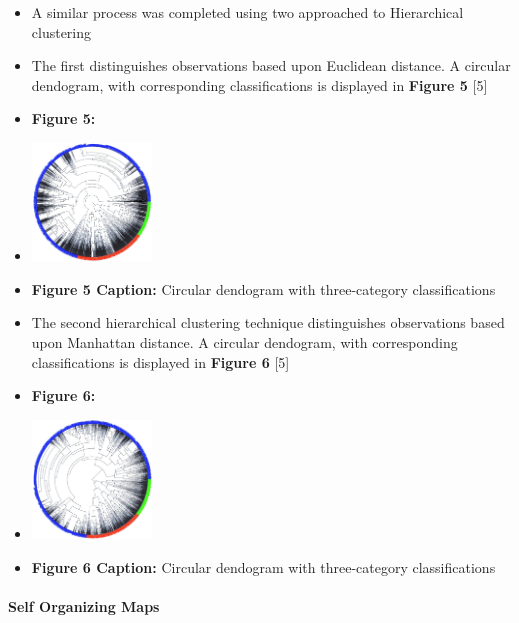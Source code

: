 \documentclass[12pt,]{article}
\providecommand{\tightlist}{%
  \setlength{\itemsep}{0pt}\setlength{\parskip}{0pt}}
\let\oldparagraph\paragraph
\renewcommand{\paragraph}[1]{\oldparagraph{#1}\mbox{}}
\begin{document}
\begin{itemize}
  \begin{itemize}
  \tightlist
  \item
    A similar process was completed using two approached to Hierarchical
    clustering
  \item
    The first distinguishes observations based upon Euclidean distance.
    A circular dendogram, with corresponding classifications is
    displayed in \textbf{Figure 5} {[}5{]}
  \item
    \textbf{Figure 5:}
  \item
    \includegraphics[width=0.25\textwidth,height=\textheight]{Hclust1Dend.jpeg}
  \item
    \textbf{Figure 5 Caption:} Circular dendogram with three-category
    classifications
  \item
    The second hierarchical clustering technique distinguishes
    observations based upon Manhattan distance. A circular dendogram,
    with corresponding classifications is displayed in \textbf{Figure 6}
    {[}5{]}
  \item
    \textbf{Figure 6:}
  \item
    \includegraphics[width=0.25\textwidth,height=\textheight]{Hclust2Dend.jpeg}
  \item
    \textbf{Figure 6 Caption:} Circular dendogram with three-category
    classifications
  \end{itemize}
\end{itemize}

\hypertarget{self-organizing-maps}{%
\paragraph{Self Organizing Maps}\label{self-organizing-maps}}
\end{document}

